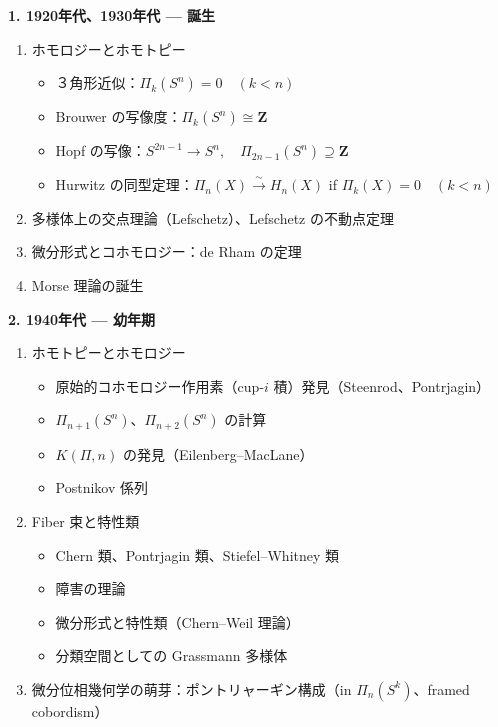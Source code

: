 \documentclass[uplatex,dvipdfmx]{jlreq}
\begin{document}
\bigskip
\noindent\textbf{1. 1920年代、1930年代 --- 誕生}

\begin{enumerate}
  \item ホモロジーとホモトピー
        \begin{itemize}
          \item ３角形近似：$\Pi_k(S^n) = 0 \quad (k < n)$
          \item Brouwer の写像度：$\Pi_k(S^n) \cong \mathbf{Z}$
          \item Hopf の写像：$S^{2n-1} \longrightarrow S^n,\quad \Pi_{2n-1}(S^n) \supseteq \mathbf{Z}$
          \item Hurwitz の同型定理：$\Pi_n(X) \stackrel{\sim}{\longrightarrow} H_n(X)$
                \quad if $\Pi_k(X) = 0 \quad (k < n)$
        \end{itemize}
  \item 多様体上の交点理論（Lefschetz）、Lefschetz の不動点定理
  \item 微分形式とコホモロジー：de Rham の定理
  \item Morse 理論の誕生
\end{enumerate}

\medskip
\noindent\textbf{2. 1940年代 --- 幼年期}

\begin{enumerate}
  \item ホモトピーとホモロジー
        \begin{itemize}
          \item 原始的コホモロジー作用素（cup-$i$ 積）発見（Steenrod、Pontrjagin）
          \item $\Pi_{n+1}(S^n)$、$\Pi_{n+2}(S^n)$ の計算
          \item $K(\Pi, n)$ の発見（Eilenberg--MacLane）
          \item Postnikov 係列
        \end{itemize}
  \item Fiber 束と特性類
        \begin{itemize}
          \item Chern 類、Pontrjagin 類、Stiefel--Whitney 類
          \item 障害の理論
          \item 微分形式と特性類（Chern--Weil 理論）
          \item 分類空間としての Grassmann 多様体
        \end{itemize}
  \item 微分位相幾何学の萌芽：ポントリャーギン構成（in $\Pi_n(S^k)$、framed cobordism）
\end{enumerate}
\end{document}

